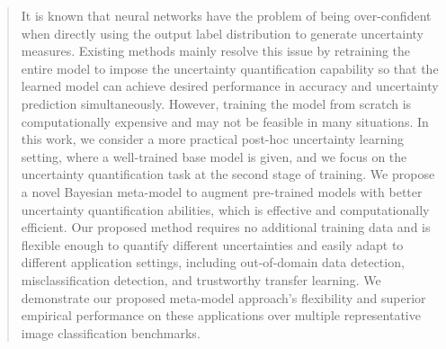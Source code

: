 \begin{abstract}

It is known that neural networks have the problem of being over-confident when directly using the output label distribution to generate uncertainty measures. Existing methods mainly resolve this issue by retraining the entire model to impose the uncertainty quantification capability so that the learned model can achieve desired performance in accuracy and uncertainty prediction simultaneously. However, training the model from scratch is computationally expensive and may not be feasible in many situations. In this work, we consider a more practical post-hoc uncertainty learning setting, where a well-trained base model is given, and we focus on the uncertainty quantification task at the second stage of training. We propose a novel Bayesian meta-model to augment pre-trained models with better uncertainty quantification abilities, which is effective and computationally efficient. Our proposed method requires no additional training data and is flexible enough to quantify different uncertainties and easily adapt to different application settings, including out-of-domain data detection, misclassification detection, and trustworthy transfer learning. We demonstrate our proposed meta-model approach's flexibility and superior empirical performance on these applications over multiple representative image classification benchmarks.


\end{abstract}
